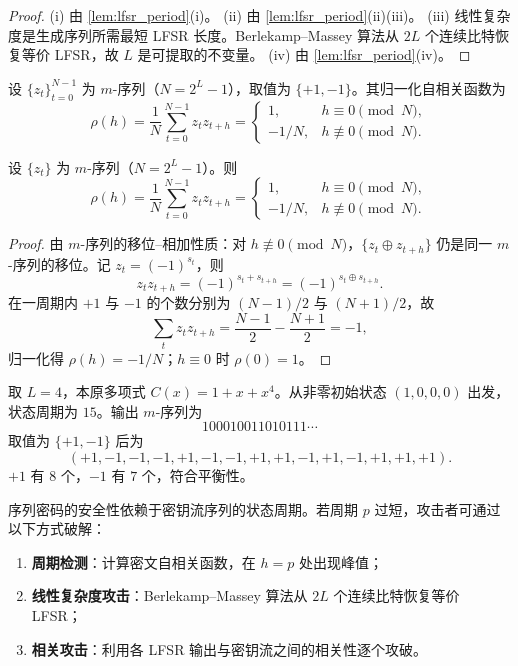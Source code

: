 \begin{proof}
(i) 由 \cref{lem:lfsr_period}(i)。
(ii) 由 \cref{lem:lfsr_period}(ii)(iii)。
(iii) 线性复杂度是生成序列所需最短 LFSR 长度。Berlekamp--Massey 算法从 \(2L\) 个连续比特恢复等价 LFSR，故 \(L\) 是可提取的不变量。
(iv) 由 \cref{lem:lfsr_period}(iv)。
\end{proof}

\begin{definition}[\(m\)-序列的自相关函数]\label{def:m_sequence_autocorrelation}
设 \(\{z_t\}_{t=0}^{N-1}\) 为 \(m\)-序列（\(N=2^L-1\)），取值为 \(\{+1,-1\}\)。其归一化自相关函数为
\[
\rho(h)=\frac1N\sum_{t=0}^{N-1}z_t z_{t+h}=
\begin{cases}
1,&h\equiv0\pmod N,\\
-1/N,&h\not\equiv0\pmod N.
\end{cases}
\]
\end{definition}

\begin{lemma}[\(m\)-序列的二值自相关]\label{ch16_mseq_autocorrelation}
设 \(\{z_t\}\) 为 \(m\)-序列（\(N=2^L-1\)）。则
\[
\rho(h)=\frac1N\sum_{t=0}^{N-1}z_t z_{t+h}=
\begin{cases}
1,&h\equiv0\pmod N,\\
-1/N,&h\not\equiv0\pmod N.
\end{cases}
\]
\end{lemma}

\begin{proof}
由 \(m\)-序列的移位--相加性质：对 \(h\not\equiv0\pmod N\)，\(\{z_t\oplus z_{t+h}\}\) 仍是同一 \(m\)-序列的移位。记 \(z_t=(-1)^{s_t}\)，则
\[
z_t z_{t+h}=(-1)^{s_t+s_{t+h}}=(-1)^{s_t\oplus s_{t+h}}.
\]
在一周期内 \(+1\) 与 \(-1\) 的个数分别为 \((N-1)/2\) 与 \((N+1)/2\)，故
\[
\sum_t z_t z_{t+h}=\frac{N-1}{2}-\frac{N+1}{2}=-1,
\]
归一化得 \(\rho(h)=-1/N\)；\(h\equiv0\) 时 \(\rho(0)=1\)。
\end{proof}

\begin{example}[\(L=4\) 的 \(m\)-序列具体计算]\label{ex:mseq_L4}
取 \(L=4\)，本原多项式 \(C(x)=1+x+x^4\)。从非零初始状态 \((1,0,0,0)\) 出发，状态周期为 \(15\)。输出 \(m\)-序列为
\[
100010011010111\cdots
\]
取值为 \(\{+1,-1\}\) 后为
\[
(+1,-1,-1,-1,+1,-1,-1,+1,+1,-1,+1,-1,+1,+1,+1).
\]
\(+1\) 有 \(8\) 个，\(-1\) 有 \(7\) 个，符合平衡性。
\end{example}

\begin{definition}[序列密码的周期攻击]\label{def:stream_cipher_period_attack}
序列密码的安全性依赖于密钥流序列的状态周期。若周期 \(p\) 过短，攻击者可通过以下方式破解：
\begin{enumerate}[label=(\roman*)]
    \item \textbf{周期检测}：计算密文自相关函数，在 \(h=p\) 处出现峰值；
    \item \textbf{线性复杂度攻击}：Berlekamp--Massey 算法从 \(2L\) 个连续比特恢复等价 LFSR；
    \item \textbf{相关攻击}：利用各 LFSR 输出与密钥流之间的相关性逐个攻破。
\end{enumerate}
\end{definition}

